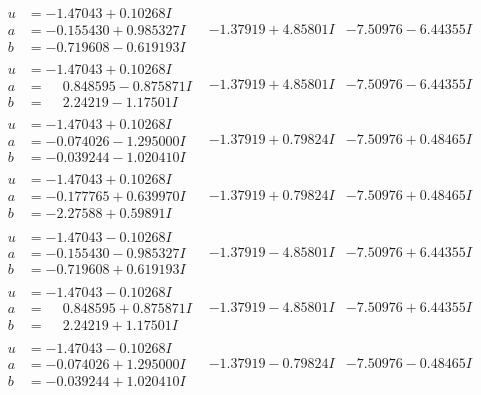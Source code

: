 \documentclass[1p]{elsarticle_modified}
\theoremstyle{definition}
\begin{document}
$$\begin{array}{c|c|c}
\begin{aligned}
u &= -1.47043 + 0.10268 I \\
a &= -0.155430 + 0.985327 I \\
b &= -0.719608 - 0.619193 I\end{aligned}
 & -1.37919 + 4.85801 I & -7.50976 - 6.44355 I \\ \hline\begin{aligned}
u &= -1.47043 + 0.10268 I \\
a &= \phantom{-}0.848595 - 0.875871 I \\
b &= \phantom{-}2.24219 - 1.17501 I\end{aligned}
 & -1.37919 + 4.85801 I & -7.50976 - 6.44355 I \\ \hline\begin{aligned}
u &= -1.47043 + 0.10268 I \\
a &= -0.074026 - 1.295000 I \\
b &= -0.039244 - 1.020410 I\end{aligned}
 & -1.37919 + 0.79824 I & -7.50976 + 0.48465 I \\ \hline\begin{aligned}
u &= -1.47043 + 0.10268 I \\
a &= -0.177765 + 0.639970 I \\
b &= -2.27588 + 0.59891 I\end{aligned}
 & -1.37919 + 0.79824 I & -7.50976 + 0.48465 I \\ \hline\begin{aligned}
u &= -1.47043 - 0.10268 I \\
a &= -0.155430 - 0.985327 I \\
b &= -0.719608 + 0.619193 I\end{aligned}
 & -1.37919 - 4.85801 I & -7.50976 + 6.44355 I \\ \hline\begin{aligned}
u &= -1.47043 - 0.10268 I \\
a &= \phantom{-}0.848595 + 0.875871 I \\
b &= \phantom{-}2.24219 + 1.17501 I\end{aligned}
 & -1.37919 - 4.85801 I & -7.50976 + 6.44355 I \\ \hline\begin{aligned}
u &= -1.47043 - 0.10268 I \\
a &= -0.074026 + 1.295000 I \\
b &= -0.039244 + 1.020410 I\end{aligned}
 & -1.37919 - 0.79824 I & -7.50976 - 0.48465 I \\ \hline\begin{aligned}

\end{aligned}
\end{array}$$
\end{document}
